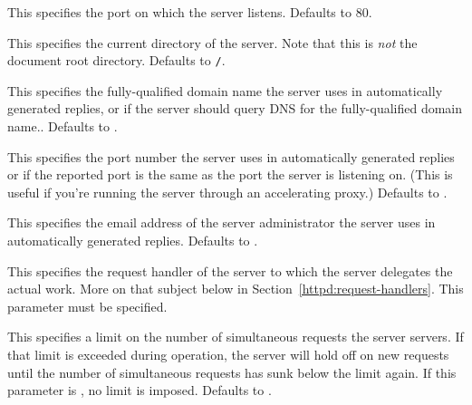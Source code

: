 \begin{desc}
  This specifies the port on which the server listens.  Defaults to 80.
\end{desc}

\begin{desc}
  This specifies the current directory of the server.  Note that this
  is \emph{not} the document root directory.  Defaults to \texttt{/}.
\end{desc}

\begin{desc}
  This specifies the fully-qualified domain name the server uses in
  automatically generated replies, or  if the server should
  query DNS for the fully-qualified domain name..  Defaults to .
\end{desc}

\begin{desc}
  This specifies the port number the server uses in automatically
  generated replies or  if the reported port is the same as
  the port the server is listening on.  (This is useful if you're
  running the server through an accelerating proxy.)  Defaults to
  .
\end{desc}

\begin{desc}
  This specifies the email address of the server administrator the
  server uses in automatically generated replies.  Defaults to .
\end{desc}

\begin{desc}
  This specifies the request handler of the server to which the server
  delegates the actual work.  More on that subject below in
  Section~\ref{httpd:request-handlers}.  This parameter must be specified.
\end{desc}

\begin{desc}
  This specifies a limit on the number of simultaneous requests the
  server servers.  If that limit is exceeded during operation, the
  server will hold off on new requests until the number of
  simultaneous requests has sunk below the limit again.  If this
  parameter is , no limit is imposed.  Defaults to .
\end{desc}

